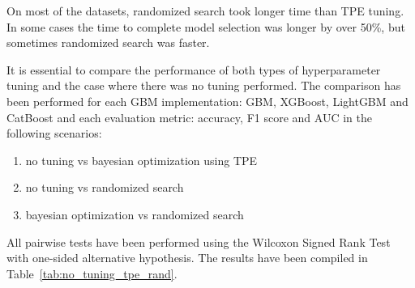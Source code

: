\documentclass[magisterska, english]{pwr_wmat_praca_dyplomowa}
\theoremstyle{plain}
\numberwithin{theorem}{chapter}
\theoremstyle{definition}
\numberwithin{theorem}{chapter}
\newcommand{\gbm}{GBM, XGBoost, LightGBM and CatBoost }
\begin{document}
On most of the datasets, randomized search took longer time than TPE tuning. In some cases the time to complete model selection was longer by over 50\%, but sometimes randomized search was faster. 

It is essential to compare the performance of both types of hyperparameter tuning and the case where there was no tuning performed. The comparison has been performed for each GBM implementation: \gbm and each evaluation metric: accuracy, F1 score and AUC in the following scenarios:

\begin{enumerate}
    \item no tuning vs bayesian optimization using TPE
    \item no tuning vs randomized search
    \item bayesian optimization vs randomized search
\end{enumerate}

All pairwise tests have been performed using the Wilcoxon Signed Rank Test with one-sided alternative hypothesis. The results have been compiled in Table~\ref{tab:no_tuning_tpe_rand}.
\end{document}
